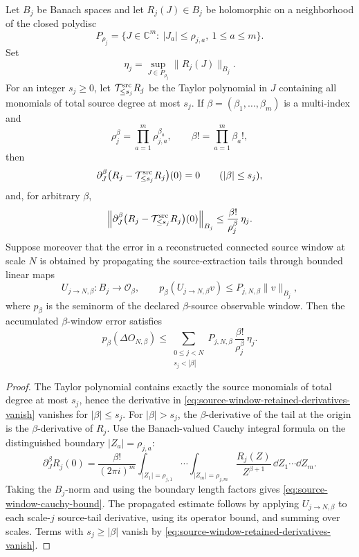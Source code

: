 \begin{lemma}
\label{lem:finite-source-window-extraction-error}
Let \(B_j\) be Banach spaces and let \(R_j(J)\in B_j\) be holomorphic on a
neighborhood of the closed polydisc
\[
  P_{\rho_j}
  =
  \{J\in\mathbb C^m:\ |J_a|\leq \rho_{j,a},\ 1\leq a\leq m\}.
\]
Set
\[
  \eta_j=\sup_{J\in P_{\rho_j}}\|R_j(J)\|_{B_j}.
\]
For an integer \(s_j\geq0\), let \(\mathcal T_{\leq s_j}^{\rm src}R_j\) be
the Taylor polynomial in \(J\) containing all monomials of total source
degree at most \(s_j\).  If \(\beta=(\beta_1,\ldots,\beta_m)\) is a
multi-index and
\[
  \rho_j^\beta=\prod_{a=1}^{m}\rho_{j,a}^{\beta_a},
  \qquad
  \beta!=\prod_{a=1}^{m}\beta_a!,
\]
then
\begin{equation}
  \partial_J^\beta
  \bigl(R_j-\mathcal T_{\leq s_j}^{\rm src}R_j\bigr)(0)=0
  \qquad (|\beta|\leq s_j),
  \label{eq:source-window-retained-derivatives-vanish}
\end{equation}
and, for arbitrary \(\beta\),
\begin{equation}
  \left\|
  \partial_J^\beta
  \bigl(R_j-\mathcal T_{\leq s_j}^{\rm src}R_j\bigr)(0)
  \right\|_{B_j}
  \leq
  \frac{\beta!}{\rho_j^\beta}\,\eta_j .
  \label{eq:source-window-cauchy-bound}
\end{equation}
Suppose moreover that the error in a reconstructed connected source window
at scale \(N\) is obtained by propagating the source-extraction tails through
bounded linear maps
\[
  U_{j\to N,\beta}:B_j\longrightarrow \mathcal O_\beta,
  \qquad
  p_\beta(U_{j\to N,\beta}v)
  \leq
  P_{j,N,\beta}\|v\|_{B_j},
\]
where \(p_\beta\) is the seminorm of the declared \(\beta\)-source
observable window.  Then the accumulated \(\beta\)-window error satisfies
\begin{equation}
  p_\beta(\Delta O_{N,\beta})
  \leq
  \sum_{\substack{0\leq j<N\\ s_j<|\beta|}}
  P_{j,N,\beta}\,
  \frac{\beta!}{\rho_j^\beta}\,
  \eta_j .
  \label{eq:source-window-propagated-error-bound}
\end{equation}
\end{lemma}

\begin{proof}
The Taylor polynomial contains exactly the source monomials of total degree
at most \(s_j\), hence the derivative in
\eqref{eq:source-window-retained-derivatives-vanish} vanishes for
\(|\beta|\leq s_j\).  For \(|\beta|>s_j\), the \(\beta\)-derivative of the
tail at the origin is the \(\beta\)-derivative of \(R_j\).  Use the
Banach-valued Cauchy integral formula on the distinguished boundary
\(|Z_a|=\rho_{j,a}\):
\[
  \partial_J^\beta R_j(0)
  =
  \frac{\beta!}{(2\pi i)^m}
  \int_{|Z_1|=\rho_{j,1}}\cdots
  \int_{|Z_m|=\rho_{j,m}}
  \frac{R_j(Z)}{Z^{\beta+1}}
  \,\dd Z_1\cdots\dd Z_m .
\]
Taking the \(B_j\)-norm and using the boundary length factors gives
\eqref{eq:source-window-cauchy-bound}.  The propagated estimate follows by
applying \(U_{j\to N,\beta}\) to each scale-\(j\) source-tail derivative,
using its operator bound, and summing over scales.  Terms with
\(s_j\geq|\beta|\) vanish by
\eqref{eq:source-window-retained-derivatives-vanish}.
\end{proof}

